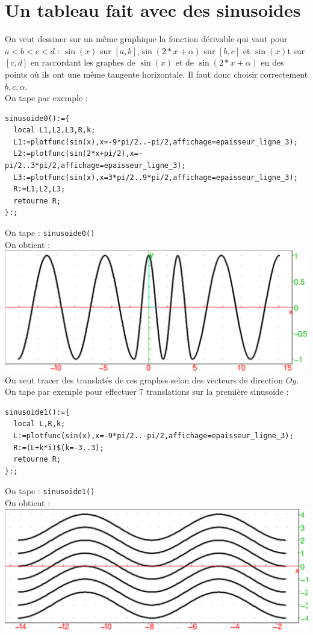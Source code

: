\documentclass[a4paper,11pt]{book}
\begin{document}
\section{Un tableau fait avec des sinusoides}
On veut dessiner sur un m\^eme graphique la fonction d\'erivable qui vaut pour
$a<b<c<d$ :
$\sin(x)$ sur $[a,b]$,$\sin(2*x+\alpha)$ sur $[b,c]$ et $\sin(x)$t sur $[c,d]$ 
en raccordant les graphes de $\sin(x)$ et de $\sin(2*x+\alpha)$ en des
 points o\`u ils ont une m\^eme tangente horizontale. Il faut donc choisir 
correctement $b,c,\alpha$.\\
On tape par exemple :
\begin{verbatim}
sinusoide0():={
  local L1,L2,L3,R,k;
  L1:=plotfunc(sin(x),x=-9*pi/2..-pi/2,affichage=epaisseur_ligne_3);
  L2:=plotfunc(sin(2*x+pi/2),x=-pi/2..3*pi/2,affichage=epaisseur_ligne_3);
  L3:=plotfunc(sin(x),x=3*pi/2..9*pi/2,affichage=epaisseur_ligne_3);
  R:=L1,L2,L3;
  retourne R;
}:;
\end{verbatim}
On tape : {\tt sinusoide0()}\\
On obtient :\\
\includegraphics[width=\textwidth]{sinusoide0}
On veut tracer des translat\'es de ces graphes selon des vecteurs de direction
$Oy$. \\
On tape par exemple pour effectuer 7 translations sur la premi\`ere sinusoide :
\begin{verbatim}
sinusoide1():={
  local L,R,k;
  L:=plotfunc(sin(x),x=-9*pi/2..-pi/2,affichage=epaisseur_ligne_3);
  R:=(L+k*i)$(k=-3..3);
  retourne R;
}:;
\end{verbatim}
On tape : {\tt sinusoide1()}\\
On obtient :\\
\includegraphics[width=\textwidth]{sinusoide1}
\end{document}
